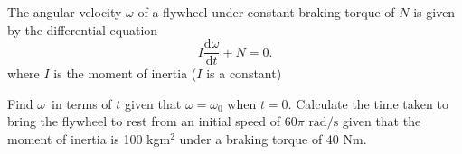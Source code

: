 \begin{Exercise}[title={Differential Equations},label=exDiffEqns]
\Question The angular velocity
$\omega $ of a flywheel under constant braking torque of $N$ is given by the differential equation
\begin{equation*}I \frac{\mathrm{d} \omega }{\mathrm{d} t} +N =0.
\end{equation*}where $I$ is the moment of inertia ($I$ is a constant) 
\begin{tasks}
	\task Find $\omega $\ in terms of $t$ given that $\omega  =\omega _{0}$ when $t =0$. 	
	\task Calculate the time taken to bring the flywheel to rest from an initial speed of $60 \pi  \text{ rad/s}$ given that the moment of inertia is 100 kgm$^2$ under a braking torque of 40 Nm.
\end{tasks}

\end{Exercise}
